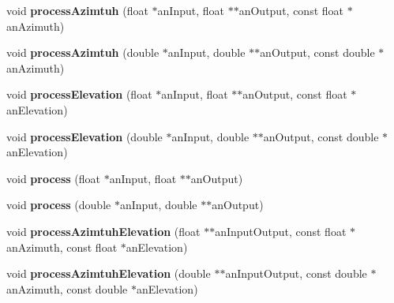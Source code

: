 \begin{DoxyCompactItemize}
\item 
\hypertarget{class_ambisonic_encoder3_d_ab708e8829b1d611f225b390c4db0d241}{void {\bfseries process\-Azimtuh} (float $\ast$an\-Input, float $\ast$$\ast$an\-Output, const float $\ast$an\-Azimuth)}\label{class_ambisonic_encoder3_d_ab708e8829b1d611f225b390c4db0d241}

\item 
\hypertarget{class_ambisonic_encoder3_d_a11e2c76d6773c9af1c622389b5d8c866}{void {\bfseries process\-Azimtuh} (double $\ast$an\-Input, double $\ast$$\ast$an\-Output, const double $\ast$an\-Azimuth)}\label{class_ambisonic_encoder3_d_a11e2c76d6773c9af1c622389b5d8c866}

\item 
\hypertarget{class_ambisonic_encoder3_d_ab3e741ce4083fe3a54b2c4acc1d56826}{void {\bfseries process\-Elevation} (float $\ast$an\-Input, float $\ast$$\ast$an\-Output, const float $\ast$an\-Elevation)}\label{class_ambisonic_encoder3_d_ab3e741ce4083fe3a54b2c4acc1d56826}

\item 
\hypertarget{class_ambisonic_encoder3_d_aa1ff07a11d2ab2a63bd3f4f72b7a7c6c}{void {\bfseries process\-Elevation} (double $\ast$an\-Input, double $\ast$$\ast$an\-Output, const double $\ast$an\-Elevation)}\label{class_ambisonic_encoder3_d_aa1ff07a11d2ab2a63bd3f4f72b7a7c6c}

\item 
\hypertarget{class_ambisonic_encoder3_d_ae197ee23c6af2c06628756558c5cfbf9}{void {\bfseries process} (float $\ast$an\-Input, float $\ast$$\ast$an\-Output)}\label{class_ambisonic_encoder3_d_ae197ee23c6af2c06628756558c5cfbf9}

\item 
\hypertarget{class_ambisonic_encoder3_d_ae251b76012533d406cff67128502461f}{void {\bfseries process} (double $\ast$an\-Input, double $\ast$$\ast$an\-Output)}\label{class_ambisonic_encoder3_d_ae251b76012533d406cff67128502461f}

\item 
\hypertarget{class_ambisonic_encoder3_d_a3d9671bb921ddcf6d0cea4aec21ba0ab}{void {\bfseries process\-Azimtuh\-Elevation} (float $\ast$$\ast$an\-Input\-Output, const float $\ast$an\-Azimuth, const float $\ast$an\-Elevation)}\label{class_ambisonic_encoder3_d_a3d9671bb921ddcf6d0cea4aec21ba0ab}

\item 
\hypertarget{class_ambisonic_encoder3_d_a532248572fd5d7f555139c8c612cbc3d}{void {\bfseries process\-Azimtuh\-Elevation} (double $\ast$$\ast$an\-Input\-Output, const double $\ast$an\-Azimuth, const double $\ast$an\-Elevation)}\label{class_ambisonic_encoder3_d_a532248572fd5d7f555139c8c612cbc3d}


\end{DoxyCompactItemize}
